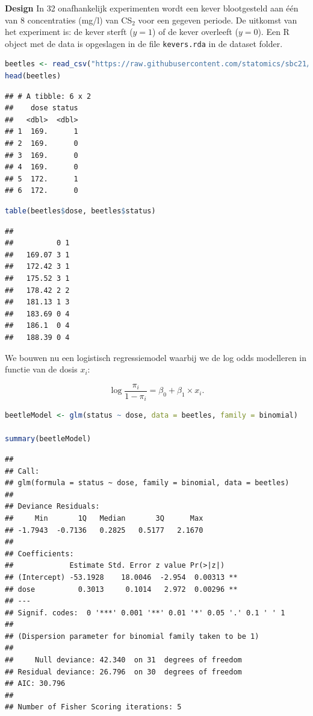\documentclass[
  12pt,dutch,coursenotes]{book}
\newcommand{\passthrough}[1]{#1}
\theoremstyle{definition}
\theoremstyle{definition}
\theoremstyle{definition}
\theoremstyle{definition}
\theoremstyle{remark}
\begin{document}
\textbf{Design} In 32 onafhankelijk experimenten wordt een kever blootgesteld aan één van 8 concentraties (mg/l) van CS\(_2\) voor een gegeven periode. De uitkomst van het experiment is: de kever sterft (\(y=1\)) of de kever overleeft (\(y=0\)).
Een R object met de data is opgeslagen in de file \passthrough{\lstinline!kevers.rda!} in de dataset folder.

\begin{lstlisting}[language=R]
beetles <- read_csv("https://raw.githubusercontent.com/statomics/sbc21/master/data/beetles.csv")
head(beetles)
\end{lstlisting}

\begin{lstlisting}
## # A tibble: 6 x 2
##    dose status
##   <dbl>  <dbl>
## 1  169.      1
## 2  169.      0
## 3  169.      0
## 4  169.      0
## 5  172.      1
## 6  172.      0
\end{lstlisting}

\begin{lstlisting}[language=R]
table(beetles$dose, beetles$status)
\end{lstlisting}

\begin{lstlisting}
##         
##          0 1
##   169.07 3 1
##   172.42 3 1
##   175.52 3 1
##   178.42 2 2
##   181.13 1 3
##   183.69 0 4
##   186.1  0 4
##   188.39 0 4
\end{lstlisting}

We bouwen nu een logistisch regressiemodel waarbij we de log odds modelleren in functie van de dosis \(x_i\):

\[\log \frac{\pi_i}{1-\pi_i}=\beta_0+\beta_1 \times x_i.\]

\begin{lstlisting}[language=R]
beetleModel <- glm(status ~ dose, data = beetles, family = binomial)

summary(beetleModel)
\end{lstlisting}

\begin{lstlisting}
## 
## Call:
## glm(formula = status ~ dose, family = binomial, data = beetles)
## 
## Deviance Residuals: 
##     Min       1Q   Median       3Q      Max  
## -1.7943  -0.7136   0.2825   0.5177   2.1670  
## 
## Coefficients:
##             Estimate Std. Error z value Pr(>|z|)   
## (Intercept) -53.1928    18.0046  -2.954  0.00313 **
## dose          0.3013     0.1014   2.972  0.00296 **
## ---
## Signif. codes:  0 '***' 0.001 '**' 0.01 '*' 0.05 '.' 0.1 ' ' 1
## 
## (Dispersion parameter for binomial family taken to be 1)
## 
##     Null deviance: 42.340  on 31  degrees of freedom
## Residual deviance: 26.796  on 30  degrees of freedom
## AIC: 30.796
## 
## Number of Fisher Scoring iterations: 5
\end{lstlisting}
\end{document}
